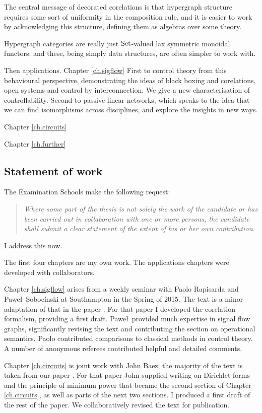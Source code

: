 The central message of decorated corelations is that hypergraph structure
requires some sort of uniformity in the composition rule, and it is easier to
work by acknowledging this structure, defining them as algebras over some
theory. 

Hypergraph categories are really just $\mathrm{Set}$-valued lax symmetric monoidal
functors: and these, being simply data structures, are often simpler to work
with.


Then applications. Chapter \ref{ch.sigflow} First to control theory from this behavioural perspective,
demonstrating the ideas of black boxing and corelations, open systems and
control by interconnection. We give a new characterisation of controllability.
Second to passive linear networks, which speaks to the idea that we can find
isomorphisms across disciplines, and explore the insights in new ways.

Chapter \ref{ch.circuits}

Chapter \ref{ch.further}


\subsection*{Statement of work}

The Examination Schools make the following request:
\begin{quote}
\emph{Where some part of the thesis is not solely the work of the candidate or
has been carried out in collaboration with one or more persons, the candidate
shall submit a clear statement of the extent of his or her own contribution.}
\end{quote}
I address this now. 

The first four chapters are my own work. The applications chapters were
developed with collaborators. 

Chapter \ref{ch.sigflow} arises from a weekly seminar with Paolo Rapisarda and
Pawe\l\ Soboc\'inski at Southampton in the Spring of 2015. The text is a minor
adaptation of that in the paper \cite{FRS16}. For that paper I developed the
corelation formalism, providing a first draft. Pawe\l\ provided much expertise
in signal flow graphs, significantly revising the text and contributing the
section on operational semantics. Paolo contributed comparisons to classical
methods in control theory.  A number of anonymous referees contributed helpful
and detailed comments.

Chapter \ref{ch.circuits} is joint work with John Baez; the majority of the text
is taken from our paper \cite{BF}. For that paper John supplied writing on
Dirichlet forms and the principle of minimum power that became the second
section of Chapter \ref{ch.circuits}, as well as parts of the next two sections.
I produced a first draft of the rest of the paper. We collaboratively revised
the text for publication.


